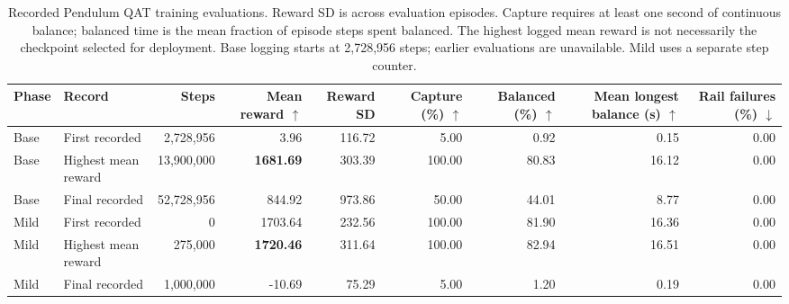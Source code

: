 \begin{landscape}
\begin{table}[htbp]
\centering
\small
\caption{Recorded Pendulum QAT training evaluations. Reward SD is across evaluation episodes. Capture requires at least one second of continuous balance; balanced time is the mean fraction of episode steps spent balanced. The highest logged mean reward is not necessarily the checkpoint selected for deployment. Base logging starts at 2,728,956 steps; earlier evaluations are unavailable. Mild uses a separate step counter.}
\label{tab:pendulum-training-summary}
\begin{adjustbox}{max width=\linewidth}
\begin{tabular}{llrrrrrrr}
\toprule
Phase & Record & Steps & Mean reward $\uparrow$ & Reward SD & Capture (\%) $\uparrow$ & Balanced (\%) $\uparrow$ & Mean longest balance (s) $\uparrow$ & Rail failures (\%) $\downarrow$ \\
\midrule
Base & First recorded & 2,728,956 & 3.96 & 116.72 & 5.00 & 0.92 & 0.15 & 0.00 \\
Base & Highest mean reward & 13,900,000 & \textbf{1681.69} & 303.39 & 100.00 & 80.83 & 16.12 & 0.00 \\
Base & Final recorded & 52,728,956 & 844.92 & 973.86 & 50.00 & 44.01 & 8.77 & 0.00 \\
\midrule
Mild & First recorded & 0 & 1703.64 & 232.56 & 100.00 & 81.90 & 16.36 & 0.00 \\
Mild & Highest mean reward & 275,000 & \textbf{1720.46} & 311.64 & 100.00 & 82.94 & 16.51 & 0.00 \\
Mild & Final recorded & 1,000,000 & -10.69 & 75.29 & 5.00 & 1.20 & 0.19 & 0.00 \\
\bottomrule
\end{tabular}
\end{adjustbox}
\end{table}
\end{landscape}
